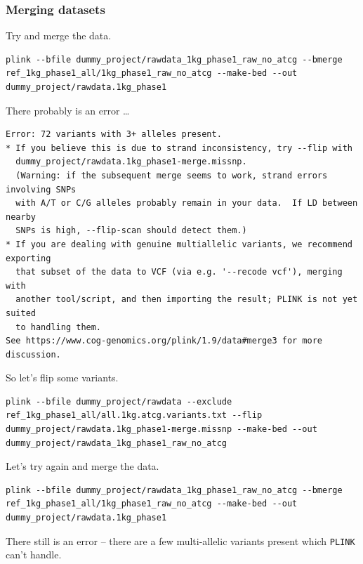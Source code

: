 \documentclass[
]{book}
\newcommand{\passthrough}[1]{#1}
\begin{document}
\hypertarget{merging-datasets}{%
\subsubsection{Merging datasets}\label{merging-datasets}}

Try and merge the data.

\begin{lstlisting}
plink --bfile dummy_project/rawdata_1kg_phase1_raw_no_atcg --bmerge ref_1kg_phase1_all/1kg_phase1_raw_no_atcg --make-bed --out dummy_project/rawdata.1kg_phase1
\end{lstlisting}

There probably is an error \ldots{}

\begin{lstlisting}
Error: 72 variants with 3+ alleles present.
* If you believe this is due to strand inconsistency, try --flip with
  dummy_project/rawdata.1kg_phase1-merge.missnp.
  (Warning: if the subsequent merge seems to work, strand errors involving SNPs
  with A/T or C/G alleles probably remain in your data.  If LD between nearby
  SNPs is high, --flip-scan should detect them.)
* If you are dealing with genuine multiallelic variants, we recommend exporting
  that subset of the data to VCF (via e.g. '--recode vcf'), merging with
  another tool/script, and then importing the result; PLINK is not yet suited
  to handling them.
See https://www.cog-genomics.org/plink/1.9/data#merge3 for more discussion.
\end{lstlisting}

So let's flip some variants.

\begin{lstlisting}
plink --bfile dummy_project/rawdata --exclude ref_1kg_phase1_all/all.1kg.atcg.variants.txt --flip dummy_project/rawdata.1kg_phase1-merge.missnp --make-bed --out dummy_project/rawdata_1kg_phase1_raw_no_atcg
\end{lstlisting}

Let's try again and merge the data.

\begin{lstlisting}
plink --bfile dummy_project/rawdata_1kg_phase1_raw_no_atcg --bmerge ref_1kg_phase1_all/1kg_phase1_raw_no_atcg --make-bed --out dummy_project/rawdata.1kg_phase1
\end{lstlisting}

There still is an error -- there are a few multi-allelic variants present which \passthrough{\lstinline!PLINK!} can't handle.
\end{document}
